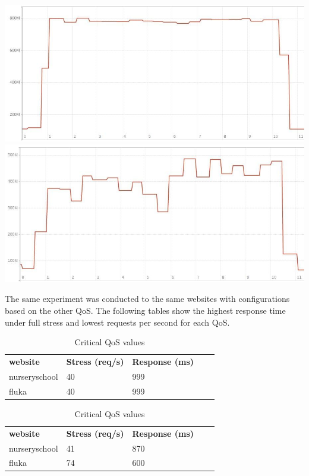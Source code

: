 \includegraphics[width=\linewidth/2]{figures/experiment-figures/nursery_memory_usage.jpg}
\includegraphics[width=\linewidth/2]{figures/experiment-figures/fluka_memory_usage.jpg}

The same experiment was conducted to the same websites with configurations based on the other QoS. 
The following tables show the highest response time under full stress and lowest requests per second for each QoS.

\begin{table}[!htb]
\centering
\parbox{.45\linewidth}{
\begin{tabular}{|l|ll|ll}
\cline{1-3}
\textbf{website} & \multicolumn{1}{l|}{\textbf{Stress (req/s)}} & \textbf{Response (ms)} &  &  \\ \cline{1-3}
nurseryschool    & 40                                           & 999                    &  &  \\ \cline{1-1}
fluka            & 40                                           & 999                    &  &  \\ \cline{1-3}
\end{tabular}
}
\hfill
\caption{Standard QoS values}
\parbox{.45\linewidth}
{\begin{tabular}{|l|ll|ll}
\cline{1-3}
\textbf{website} & \multicolumn{1}{l|}{\textbf{Stress (req/s)}} & \textbf{Response (ms)} &  &  \\ \cline{1-3}
nurseryschool    & 41  & 870   &  &  \\ \cline{1-1}
fluka            & 74  & 600   &  &  \\ \cline{1-3}
\end{tabular}
}
\caption{ Critical QoS values}
\end{table}





